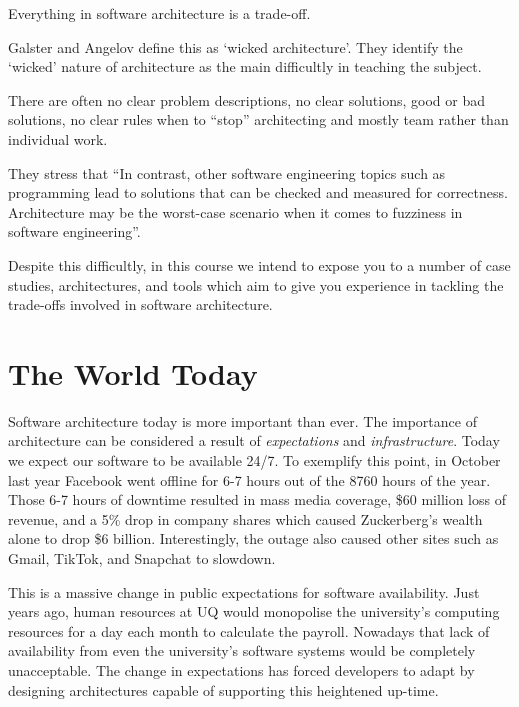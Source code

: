 \begin{definition}
Everything in software architecture is a trade-off.
\end{definition}

Galster and Angelov \cite{wicked-architecture} define this as `wicked architecture'.
They identify the `wicked' nature of architecture as the main difficultly in teaching the subject.

\begin{definition}
There are often no clear problem descriptions, no clear solutions, good or bad solutions, no clear rules when to ``stop'' architecting
and mostly team rather than individual work.
\end{definition}

They stress that ``In contrast, other software engineering topics such as programming lead to solutions that can be checked and measured for correctness.
Architecture may be the worst-case scenario when it comes to fuzziness in software engineering''.

Despite this difficultly, in this course we intend to expose you to a number of case studies, architectures,
and tools which aim to give you experience in tackling the trade-offs involved in software architecture.

\section{The World Today}
Software architecture today is more important than ever.
The importance of architecture can be considered a result of \textsl{expectations} and \textsl{infrastructure}.
Today we expect our software to be available 24/7.
To exemplify this point, in October last year Facebook went offline for 6-7 hours out of the 8760 hours of the year.
Those 6-7 hours of downtime resulted in mass media coverage, \$60 million loss of revenue,
and a 5\% drop in company shares which caused Zuckerberg's wealth alone to drop \$6 billion.
Interestingly, the outage also caused other sites such as Gmail, TikTok, and Snapchat to slowdown.

This is a massive change in public expectations for software availability.
Just  years ago,
human resources at UQ would monopolise the university's computing resources for a day each month to calculate the payroll.
Nowadays that lack of availability from even the university's software systems would be completely unacceptable.
The change in expectations has forced developers to adapt by designing architectures capable of supporting this heightened up-time.

